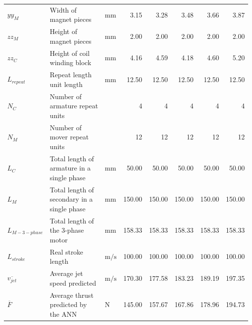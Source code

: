 \begin{landscape}
\begin{table}
\begin{tabular}{lllrrrrr}
                            $yy_M$                  & Width of magnet pieces                               & $\mathrm{mm}$  & 3.15   & 3.28   & 3.48   & 3.66   & 3.87   \\
                            $zz_M$                  & Height of magnet pieces                              & $\mathrm{mm}$  & 2.00   & 2.00   & 2.00   & 2.00   & 2.00   \\
                            $zz_C$                  & Height of coil winding block                         & $\mathrm{mm}$  & 4.16   & 4.59   & 4.18   & 4.60   & 5.20   \\
                        \hline
                            $L_{repeat}$             & Repeat length unit length                            & $\mathrm{mm}$  & 12.50  & 12.50  & 12.50  & 12.50  & 12.50  \\
                            $N_C$                   & Number of armature repeat units                      &                & 4      & 4      & 4      & 4      & 4      \\
                            $N_M$                   & Number of mover repeat units                         &                & 12     & 12     & 12     & 12     & 12     \\
                            $L_C$                   & Total length of armature in a single phase           & $\mathrm{mm}$  & 50.00  & 50.00  & 50.00  & 50.00  & 50.00  \\
                            $L_M$                   & Total length of secondary in a single phase          & $\mathrm{mm}$  & 150.00 & 150.00 & 150.00 & 150.00 & 150.00 \\
                            $L_{M-3-phase}$         & Total length of the 3-phase motor                    & $\mathrm{mm}$  & 158.33 & 158.33 & 158.33 & 158.33 & 158.33 \\
                            $L_{stroke}$            & Real stroke length                                   & $\mathrm{m/s}$ & 100.00 & 100.00 & 100.00 & 100.00 & 100.00 \\
                        \hline
                            $\overline{v_{jet}}$    & Average jet speed predicted                          & $\mathrm{m/s}$ & 170.30 & 177.58 & 183.23 & 189.19 & 197.35 \\
                            $\overline{F}$          & Average thrust predicted by the \acs{ANN}            & $\mathrm{N}$   & 145.00 & 157.67 & 167.86 & 178.96 & 194.73 \\
                        \hline
                    \end{tabular}
                \end{table}
            \end{landscape}
                
